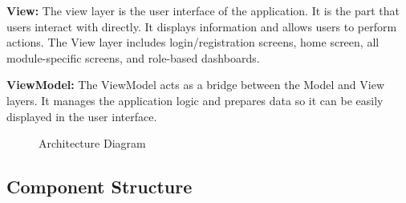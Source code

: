 \textbf{View:} The view layer is the user interface of the application. It is the part that users interact with directly. It displays information and allows users to perform actions. The View layer includes login/registration screens, home screen, all module-specific screens, and role-based dashboards.

\textbf{ViewModel:} The ViewModel acts as a bridge between the Model and View layers. It manages the application logic and prepares data so it can be easily displayed in the user interface.

\begin{figure}[H]
\centering
\caption{Architecture Diagram}
\label{fig:architecture}
\end{figure}

\subsection{Component Structure}

